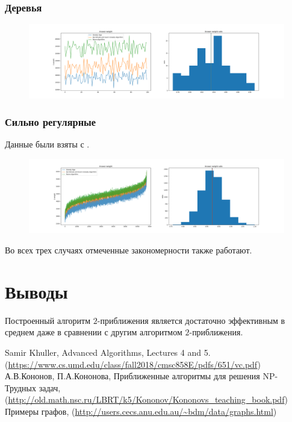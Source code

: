 \documentclass{article}
\theoremstyle{definition}
\begin{document}
  \subsubsection{Деревья}
  \begin{figure}[H]
    \includegraphics[scale=0.3]{img/random_tree_quick}
  \end{figure}
  \subsubsection{Сильно регулярные}
  Данные были взяты с \cite{graphs_source}.
  \begin{figure}[H]
    \includegraphics[scale=0.3]{img/srg_quick}
  \end{figure}
  Во всех трех случаях отмеченные закономерности также работают.
  \section{Выводы}
  Построенный алгоритм $2$-приближения является достаточно эффективным в среднем 
  даже в сравнении с другим алгоритмом $2$-приближения.
  \begin{thebibliography}{1}
      Samir Khuller, Advanced Algorithms, Lectures 4 and 5. 
      (\url{https://www.cs.umd.edu/class/fall2018/cmsc858E/pdfs/651/vc.pdf})
      А.В.Кононов, П.А.Кононова, Приближенные алгоритмы для решения NP-Трудных задач,\\
      (\url{http://old.math.nsc.ru/LBRT/k5/Kononov/Kononovs_teaching_book.pdf})
      Примеры графов,
      (\url{http://users.cecs.anu.edu.au/~bdm/data/graphs.html})

  \end{thebibliography}
\end{document}
